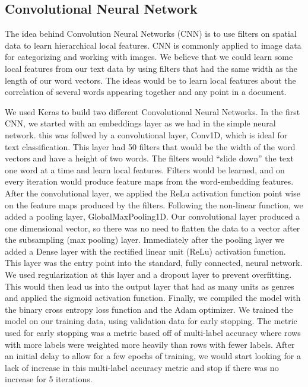 \documentclass[sigconf]{acmart}
\begin{document}
\subsection{Convolutional Neural Network}
The idea behind Convolution Neural Networks (CNN) is to use filters on spatial data to learn hierarchical local features. CNN is commonly applied to image data for categorizing and working with images. We believe that we could learn some local features from our text data by using filters that had the same width as the length of our word vectors.  The ideas would be to learn local features about the correlation of several words appearing together and any point in a document.

We used Keras to build two different Convolutional Neural Networks.  In the first CNN, we started with an embeddings layer as we had in the simple neural network.  this was follwed by a convolutional layer, Conv1D, which is ideal for text classification. This layer had 50 filters that would be the width of the word vectors and have a height of two words.  The filters would ``slide down'' the text one word at a time and learn local features.  Filters would be learned, and on every iteration would produce feature maps from the word-embedding features. After the convolutional layer, we applied the ReLu activation function point wise on the feature maps produced by the filters.  Following the non-linear function, we added a pooling layer, GlobalMaxPooling1D. Our convolutional layer produced a one dimensional vector, so there was no need to flatten the data to a vector after the subsampling (max pooling) layer. Immediately after the pooling layer we added a Dense layer with the rectified linear unit (ReLu) activation function.  This layer was the entry point into the standard, fully connected, neural network. We used regularization at this layer and a dropout layer to prevent overfitting.  This would then lead us into the output layer that had as many units as genres and applied the sigmoid activation function. Finally, we compiled the model with the binary cross entropy loss function and the Adam optimizer. We trained the model on our training data, using validation data for early stopping.  The metric used for early stopping was a metric based off of multi-label accuracy where rows with more labels were weighted more heavily than rows with fewer labels. After an initial delay to allow for a few epochs of training, we would start looking for a lack of increase in this multi-label accuracy metric and stop if there was no increase for 5 iterations. 
\end{document}
